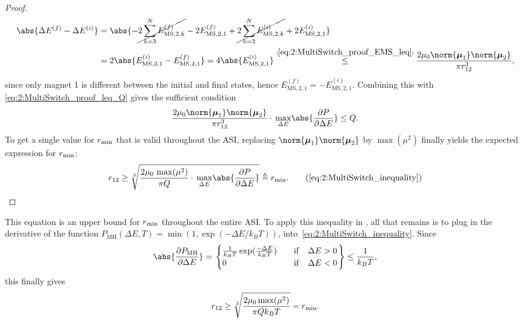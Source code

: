 \begin{proof}
	\begin{align*}
		\abs{\Delta E^{(f)} - \Delta E^{(i)}} &= \abs{-\cancel{2 \sum_{k=3}^N E_{\mathrm{MS},2,k}^{(f)}} -2 E_{\mathrm{MS},2,1}^{(f)} +\cancel{2 \sum_{k=3}^N E_{\mathrm{MS},2,k}^{(i)}} +2 E_{\mathrm{MS},2,1}^{(i)}} \\
		&= 2\abs{E_{\mathrm{MS},2,1}^{(i)} - E_{\mathrm{MS},2,1}^{(f)}} = 4 \abs{E_{\mathrm{MS},2,1}^{(i)}} \numeq{\ref{eq:2:MultiSwitch_proof_EMS_leq}}{\leq} \frac{2 \mu_0 \norm{\vc{\mu}_1} \norm{\vc{\mu}_2}}{\pi r_{12}^3} \mathrm{,}
	\end{align*}
	since only magnet 1 is different between the initial and final states, hence $E_{\mathrm{MS},2,1}^{(f)} = - E_{\mathrm{MS},2,1}^{(i)}$.
	Combining this with \eqref{eq:2:MultiSwitch_proof_leq_Q} gives the sufficient condition
	\begin{equation}
		\frac{2 \mu_0 \norm{\vc{\mu}_1} \norm{\vc{\mu}_2}}{\pi r_{12}^3} \cdot \, \underset{\Delta E}{\max} \abs{\frac{\partial P}{\partial \Delta E}} \leq Q \mathrm{.}
	\end{equation}
	To get a single value for $r_\mathrm{min}$ that is valid throughout the ASI, replacing $\norm{\vc{\mu}_1} \norm{\vc{\mu}_2}$ by $\max(\mu^2)$ finally yields the expected expression for $r_\mathrm{min}$:
	\begin{equation*}
		r_{12} \geq \sqrt[3]{\frac{2 \mu_0 \, \max(\mu^2)}{\pi Q} \cdot \, \underset{\Delta E}{\max} \abs{\frac{\partial P}{\partial \Delta E}}} \triangleq \rmin \mathrm{.} \tag{\ref*{eq:2:MultiSwitch_inequality}}
	\end{equation*}
\end{proof}
This equation is an upper bound for $r_\mathrm{min}$ throughout the entire ASI.
To apply this inequality in \hotspice, all that remains is to plug in the derivative of the   function $P_\mathrm{MH}(\Delta E, T) = \min(1, \exp(-\Delta E/k_B T))$, into~\cref{eq:2:MultiSwitch_inequality}.
Since
\begin{equation}
	\abs{\frac{\partial P_\mathrm{MH}}{\partial \Delta E}} = \left.\begin{cases}
		\frac{1}{k_B T} \exp(\frac{-\Delta E}{k_B T}) \quad &\mathrm{if} \quad \Delta E > 0 \\
		0 \quad &\mathrm{if} \quad \Delta E < 0
	\end{cases} \right\}
	\leq \frac{1}{k_B T} \mathrm{,}
\end{equation}
this finally gives
\begin{equation}
	r_{12} \geq \sqrt[3]{\frac{2 \mu_0 \max(\mu^2)}{\pi Q k_B T}} = r_\mathrm{min} \mathrm{.}
\end{equation}

